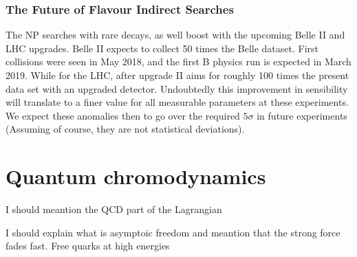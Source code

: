 \subsubsection{The Future of Flavour Indirect Searches}

The NP searches with rare decays, as well boost with the upcoming Belle II and LHC upgrades. Belle II expects to collect 50 times the Belle dataset. First collisions were seen in May 2018, and the first B physics run is expected in March 2019. While for the LHC, after upgrade II aims for roughly 100 times the present data set with an upgraded detector. 
%
%
Undoubtedly this improvement in sensibility will translate to a finer value for all measurable parameters at these experiments. We expect these anomalies then to go over the required $5 \sigma$ in future experiments (Assuming of course, they are not statistical deviations). 

{\color{green} 
\section{Quantum chromodynamics}
I should meantion the QCD part of the Lagrangian 

I should explain what is asymptoic freedom and meantion that the strong force fades fast. Free quarks at high energies}


